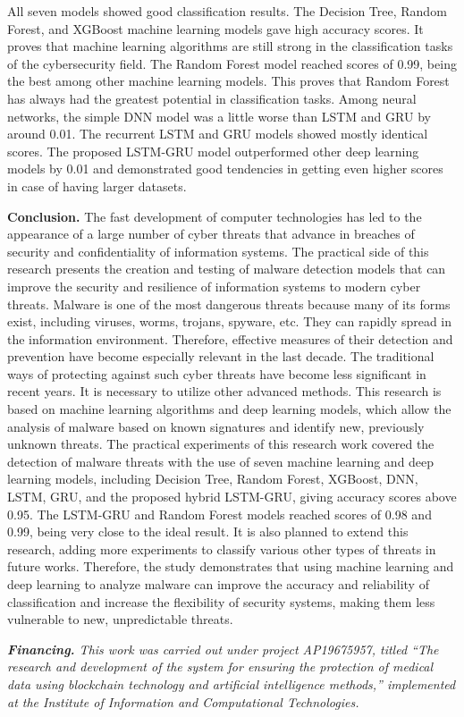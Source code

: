 \begin{multicols}{2}
All seven models showed good classification results. The Decision Tree,
Random Forest, and XGBoost machine learning models gave high accuracy
scores. It proves that machine learning algorithms are still strong in
the classification tasks of the cybersecurity field. The Random Forest
model reached scores of 0.99, being the best among other machine
learning models. This proves that Random Forest has always had the
greatest potential in classification tasks. Among neural networks, the
simple DNN model was a little worse than LSTM and GRU by around 0.01.
The recurrent LSTM and GRU models showed mostly identical scores. The
proposed LSTM-GRU model outperformed other deep learning models by 0.01
and demonstrated good tendencies in getting even higher scores in case
of having larger datasets.

{\bfseries Conclusion.} The fast development of computer technologies has
led to the appearance of a large number of cyber threats that advance in
breaches of security and confidentiality of information systems. The
practical side of this research presents the creation and testing of
malware detection models that can improve the security and resilience of
information systems to modern cyber threats. Malware is one of the most
dangerous threats because many of its forms exist, including viruses,
worms, trojans, spyware, etc. They can rapidly spread in the information
environment. Therefore, effective measures of their detection and
prevention have become especially relevant in the last decade. The
traditional ways of protecting against such cyber threats have become
less significant in recent years. It is necessary to utilize other
advanced methods. This research is based on machine learning algorithms
and deep learning models, which allow the analysis of malware based on
known signatures and identify new, previously unknown threats. The
practical experiments of this research work covered the detection of
malware threats with the use of seven machine learning and deep learning
models, including Decision Tree, Random Forest, XGBoost, DNN, LSTM, GRU,
and the proposed hybrid LSTM-GRU, giving accuracy scores above 0.95. The
LSTM-GRU and Random Forest models reached scores of 0.98 and 0.99, being
very close to the ideal result. It is also planned to extend this
research, adding more experiments to classify various other types of
threats in future works. Therefore, the study demonstrates that using
machine learning and deep learning to analyze malware can improve the
accuracy and reliability of classification and increase the flexibility
of security systems, making them less vulnerable to new, unpredictable
threats.

\emph{{\bfseries Financing.} This work was carried out under project
AP19675957, titled ``The research and development of the system for
ensuring the protection of medical data using blockchain technology and
artificial intelligence methods,'' implemented at the Institute of
Information and Computational Technologies.}
\end{multicols}

